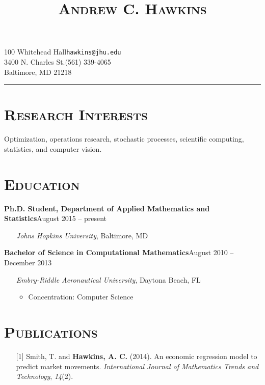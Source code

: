 \documentclass[10pt]{article}
\title{\textsc{\textbf{Andrew C. Hawkins}}\vspace{-13.7ex}}
\date{}
\author{}
\begin{document}
\maketitle

\section*{}
100 Whitehead Hall\hfill \texttt{hawkins@jhu.edu}\\
3400 N. Charles St.\hfill (561) 339-4065\\
Baltimore, MD 21218

\noindent\rule{6.77in}{1pt}

\section*{\textsc{Research Interests}}
Optimization, operations research, stochastic processes, scientific computing, statistics, and computer vision.

\section*{\textsc{Education}}
\textbf{Ph.D. Student, Department of Applied Mathematics and Statistics}\hfill August 2015 -- present
\begin{itemize}[noitemsep]
    \item[] \textit{Johns Hopkins University}, Baltimore, MD
\end{itemize}
\vspace{2ex}
\textbf{Bachelor of Science in Computational Mathematics}\hfill August 2010 -- December 2013
\begin{itemize}[noitemsep]
    \item[] \textit{Embry-Riddle Aeronautical University}, Daytona Beach, FL
    \begin{itemize}[noitemsep]
        \item Concentration: Computer Science
    \end{itemize}
\end{itemize}

\section*{\textsc{Publications}}
\begin{itemize}[leftmargin=*]
    \item[] [1] Smith, T. and \textbf{Hawkins, A. C.} (2014). An economic regression model to predict market movements. \textit{International Journal of Mathematics Trends and Technology}, \textit{14}(2).
\end{itemize}
\end{document}
